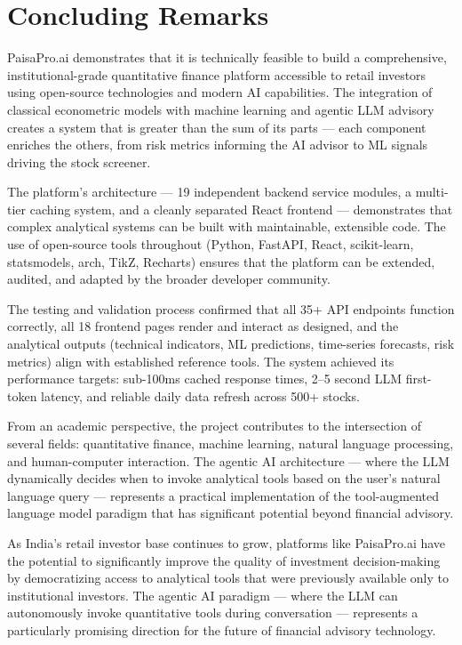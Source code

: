 \documentclass[12pt, a4paper, oneside]{report}
\newcommand{\projectname}{PaisaPro.ai}
\begin{document}
\section{Concluding Remarks}
\label{sec:concluding}

\projectname{} demonstrates that it is technically feasible to build a comprehensive, institutional-grade quantitative finance platform accessible to retail investors using open-source technologies and modern AI capabilities. The integration of classical econometric models with machine learning and agentic LLM advisory creates a system that is greater than the sum of its parts --- each component enriches the others, from risk metrics informing the AI advisor to ML signals driving the stock screener.

The platform's architecture --- 19 independent backend service modules, a multi-tier caching system, and a cleanly separated React frontend --- demonstrates that complex analytical systems can be built with maintainable, extensible code. The use of open-source tools throughout (Python, FastAPI, React, scikit-learn, statsmodels, arch, TikZ, Recharts) ensures that the platform can be extended, audited, and adapted by the broader developer community.

The testing and validation process confirmed that all 35+ API endpoints function correctly, all 18 frontend pages render and interact as designed, and the analytical outputs (technical indicators, ML predictions, time-series forecasts, risk metrics) align with established reference tools. The system achieved its performance targets: sub-100ms cached response times, 2--5 second LLM first-token latency, and reliable daily data refresh across 500+ stocks.

From an academic perspective, the project contributes to the intersection of several fields: quantitative finance, machine learning, natural language processing, and human-computer interaction. The agentic AI architecture --- where the LLM dynamically decides when to invoke analytical tools based on the user's natural language query --- represents a practical implementation of the tool-augmented language model paradigm that has significant potential beyond financial advisory.

As India's retail investor base continues to grow, platforms like \projectname{} have the potential to significantly improve the quality of investment decision-making by democratizing access to analytical tools that were previously available only to institutional investors. The agentic AI paradigm --- where the LLM can autonomously invoke quantitative tools during conversation --- represents a particularly promising direction for the future of financial advisory technology.
\end{document}
